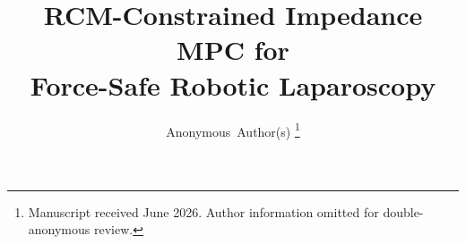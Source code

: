 \documentclass[journal]{IEEEtran}
\begin{document}
\title{RCM-Constrained Impedance MPC for\\Force-Safe Robotic Laparoscopy}

\author{Anonymous~Author(s)%
\thanks{Manuscript received June 2026. Author information omitted for double-anonymous review.}%
}

\maketitle
\thispagestyle{empty}
\pagestyle{empty}



\balance
\end{document}
